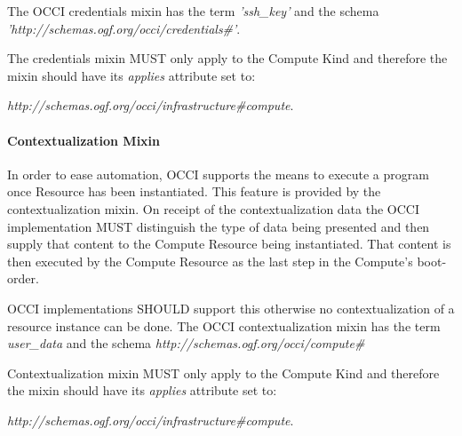 \documentclass[10pt,a4paper]{article}
\begin{document}
The OCCI credentials mixin has the term \textit{'ssh\_key'} and the schema \textit{'http://schemas.ogf.org/occi/credentials\#'}.

The credentials mixin MUST only apply to the Compute Kind and therefore
the mixin should have its  \textit{applies} attribute set to:

\textit{http://schemas.ogf.org/occi/infrastructure\#compute}.



\paragraph{Contextualization Mixin}

In order to ease automation, OCCI supports the means to execute a
program once Resource has been instantiated. This feature is
provided by the contextualization mixin. On receipt of the
contextualization data the OCCI implementation MUST distinguish
the type of data being presented and then supply that content to the
Compute Resource being instantiated. That content is then executed
by the Compute Resource as the last step in the Compute's boot-order.

OCCI implementations SHOULD support this otherwise no
contextualization of a resource instance can be done.
The OCCI contextualization mixin has the term \textit{user\_data}
and the schema \textit{http://schemas.ogf.org/occi/compute\#}

Contextualization mixin MUST only apply to the Compute Kind and therefore
the mixin should have its  \textit{applies} attribute set to:

\textit{http://schemas.ogf.org/occi/infrastructure\#compute}.

\end{document}
